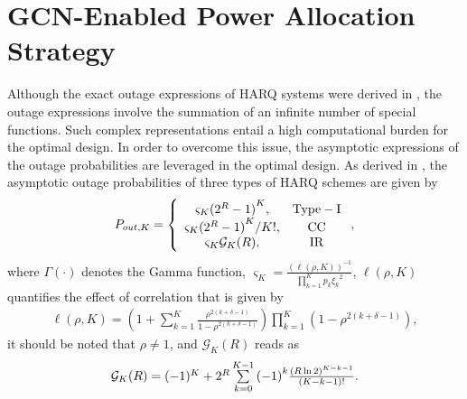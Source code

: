 \documentclass[conference]{IEEEtran}
\begin{document}
\section{GCN-Enabled Power Allocation Strategy}\label{sec:gcnmodel}
Although the exact outage expressions of HARQ systems were derived in \cite{7448651,7833558,7959548}, the outage expressions involve the summation of an infinite number of special functions. Such complex representations entail a high computational burden for the optimal design. In order to overcome this issue, the asymptotic expressions of the outage probabilities are leveraged in the optimal design. As derived in \cite{7448651,7833558,7959548}, the asymptotic outage probabilities of three types of HARQ schemes are given by %
\begin{equation}\label{eqn:pout_asy}
{P_{out,K}} = \left\{ {\begin{array}{*{20}{c}}
{{\varsigma _K}{{({2^R} - 1)}^K},}&{{\rm{Type-I}}}\\
{{\varsigma _K}{{({2^R} - 1)}^K}/K!,}&{{\rm{CC}}}\\
{{\varsigma _K}{\mathcal G_K}(R),}&{{\rm{IR}}}
\end{array}} \right.,
\end{equation}
where $\Gamma \left(  \cdot  \right)$ denotes the Gamma function, %
${\varsigma _K} = \frac{{{{\left( {\ell\left( {\rho ,K} \right)} \right)}^{ - 1}}}}{{\prod\nolimits_{k = 1}^K {{p_k}{\xi _k}^2} }}$, ${\ell}(\rho ,K)$ quantifies the effect of correlation that is given by
\begin{equation}\label{eqn:L_func}
\begin{array}{l}
{\ell}(\rho ,K) = \left(1 + \sum\limits_{k = 1}^K {\frac{{{\rho ^{2(k + \delta  - 1)}}}}{{1 - {\rho ^{2(k + \delta  - 1)}}}}} \right)\prod\limits_{k = 1}^K {\left(1 - {\rho ^{2(k + \delta  - 1)}}\right)},
\end{array}
\end{equation}
it should be noted that $\rho \ne 1$, and $\mathcal G_K(R)$ reads as
\begin{equation}\label{eqn:g_func}
\begin{array}{l}
{{\cal G}_K}(R) = {( - 1)^K} + {2^R}\sum\limits_{k = 0}^{K - 1} {{{( - 1)}^k}\frac{{{{(R\ln 2)}^{K - k - 1}}}}{{(K - k - 1)!}}}.
\end{array}
\end{equation}
\end{document}
